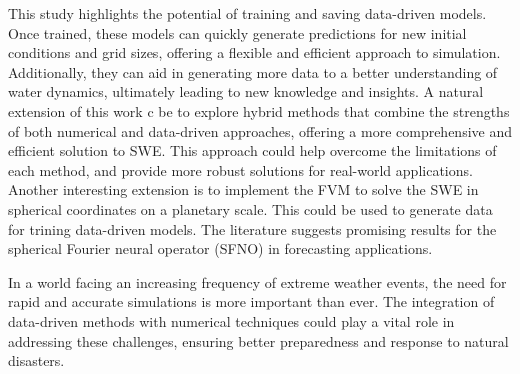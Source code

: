 This study highlights the potential of training and saving data-driven models.
Once trained, these models can quickly generate predictions for new initial conditions and grid sizes, offering a flexible and efficient approach to simulation.
Additionally, they can aid in generating more data to a better understanding of water dynamics, ultimately leading to new knowledge and insights.
A natural extension of this work c be to explore hybrid methods that combine the strengths of both numerical and data-driven approaches, offering a more comprehensive and efficient solution to SWE.
This approach could help overcome the limitations of each method, and provide more robust solutions for real-world applications.
Another interesting extension is to implement the FVM to solve the SWE in spherical coordinates on a planetary scale.
This could be used to generate data for trining data-driven models.
The literature suggests promising results for the spherical Fourier neural operator (SFNO) in forecasting applications.

In a world facing an increasing frequency of extreme weather events, the need for rapid and accurate simulations is more important than ever.
The integration of data-driven methods with numerical techniques could play a vital role in addressing these challenges, ensuring better preparedness and response to natural disasters. 


